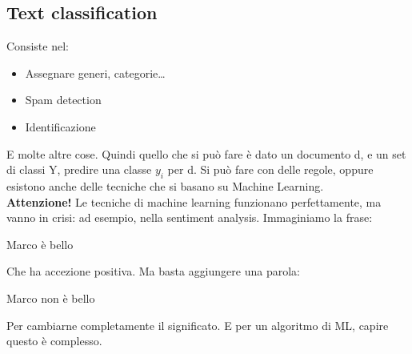 \subsection{Text classification}
Consiste nel:
\begin{itemize}
    \item Assegnare generi, categorie\dots
    \item Spam detection
    \item Identificazione
\end{itemize}
E molte altre cose. Quindi quello che si può fare è dato un documento d, e un set di classi Y, predire una classe $y_i$ per d. Si può fare con delle regole, oppure esistono anche delle tecniche che si basano su Machine Learning. 
\\
\textbf{Attenzione!} Le tecniche di machine learning funzionano perfettamente, ma vanno in crisi: ad esempio, nella sentiment analysis. Immaginiamo la frase:
\begin{center}
    Marco è bello
\end{center}
Che ha accezione positiva. Ma basta aggiungere una parola:
\begin{center}
    Marco non è bello
\end{center}
Per cambiarne completamente il significato. E per un algoritmo di ML, capire questo è complesso. 

